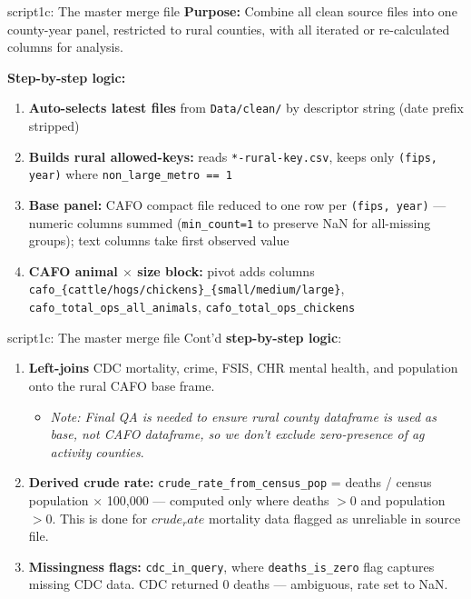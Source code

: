 \documentclass[aspectratio=169]{beamer}
\begin{document}
\begin{frame}{script1c: The master merge file}
\textbf{Purpose:} Combine all clean source files into one county-year panel, restricted to rural counties, with all iterated or re-calculated columns for analysis.

\vspace{0.3em}
\textbf{Step-by-step logic:}
\begin{enumerate}\small
    \item \textbf{Auto-selects latest files} from \texttt{Data/clean/} by descriptor string (date prefix stripped)
    \item \textbf{Builds rural allowed-keys:} reads \texttt{*-rural-key.csv}, keeps only \texttt{(fips, year)} where \texttt{non\_large\_metro == 1}
    \item \textbf{Base panel:} CAFO compact file reduced to one row per \texttt{(fips, year)} — numeric columns summed (\texttt{min\_count=1} to preserve NaN for all-missing groups); text columns take first observed value
    \item \textbf{CAFO animal $\times$ size block:} pivot adds columns \texttt{cafo\_\{cattle/hogs/chickens\}\_\{small/medium/large\}}, \texttt{cafo\_total\_ops\_all\_animals}, \texttt{cafo\_total\_ops\_chickens}
\end{enumerate}
\end{frame}

\begin{frame}{script1c: The master merge file}
Cont'd \textbf{step-by-step logic}:
\begin{enumerate}
    \item[5] \textbf{Left-joins} CDC mortality, crime, FSIS, CHR mental health, and population onto the rural CAFO base frame. 
    \begin{itemize}
        \item \textit{Note: Final QA is needed to ensure  rural county dataframe is used as base, not CAFO dataframe, so we don't exclude zero-presence of ag activity counties}. 
    \end{itemize}
    \item[6] \textbf{Derived crude rate:} \texttt{crude\_rate\_from\_census\_pop} = deaths / census population $\times$ 100{,}000 — computed only where deaths $> 0$ and population $> 0$. This is done for $crude_rate$ mortality data flagged as unreliable in source file. 
    \item[7] \textbf{Missingness flags:} \texttt{cdc\_in\_query}, where \texttt{deaths\_is\_zero} flag captures missing CDC data. CDC returned 0 deaths — ambiguous, rate set to NaN. 
\end{enumerate}
\end{frame}
\end{document}
